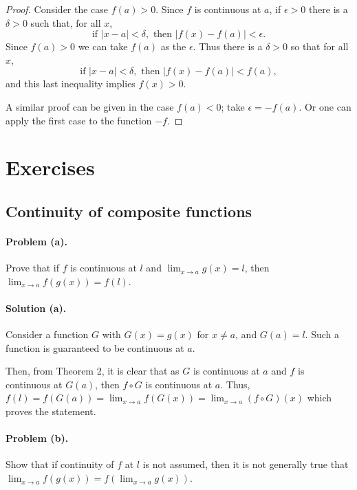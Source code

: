 \documentclass{article}
\begin{document}
\begin{proof}
  Consider the case $f(a) > 0$. Since $f$ is continuous at $a$, if $\epsilon >
  0$ there is a $\delta > 0$ such that, for all $x$, \begin{equation*}
    \text{if } |x - a| < \delta, \text{ then } |f(x) - f(a)| < \epsilon.
  \end{equation*}
  Since $f(a) > 0$ we can take $f(a)$ as the $\epsilon$. Thus there is a
  $\delta > 0$ so that for all $x$, \begin{equation*}
    \text{if } |x - a| < \delta, \text{ then } |f(x) - f(a)| < f(a),
  \end{equation*}
  and this last inequality implies $f(x) > 0$.

  A similar proof can be given in the case $f(a) < 0$; take $\epsilon = -f(a)$.
  Or one can apply the first case to the function $-f$.
\end{proof}

\section{Exercises}

\setcounter{subsection}{11}
\subsection{Continuity of composite functions}

\paragraph{Problem (a).} Prove that if $f$ is continuous at $l$ and $\lim_{x
\rightarrow a}g(x) = l$, then $\lim_{x \rightarrow a}f(g(x)) = f(l)$.

\paragraph{Solution (a).} Consider a function $G$ with $G(x) = g(x)$ for $x
\neq a$, and $G(a) = l$. Such a function is guaranteed to be continuous at $a$.

Then, from Theorem 2, it is clear that as $G$ is continuous at $a$ and $f$ is
continuous at $G(a)$, then $f \circ G$ is continuous at $a$. Thus, $f(l) =
f(G(a)) = \lim_{x \rightarrow a}f(G(x)) = \lim_{x \rightarrow a}(f \circ G)(x)$
which proves the statement.

\paragraph{Problem (b).} Show that if continuity of $f$ at $l$ is not assumed,
then it is not generally true that $\lim_{x \rightarrow a}f(g(x)) = f(\lim_{x
\rightarrow a}g(x))$.
\end{document}
